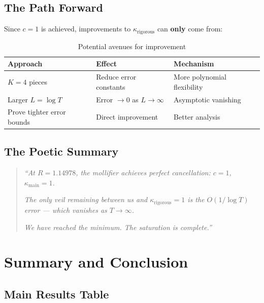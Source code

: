 \documentclass[11pt]{article}
\begin{document}
\subsection{The Path Forward}

Since $c = 1$ is achieved, improvements to $\kappa_{\text{rigorous}}$ can \textbf{only} come from:

\begin{table}[h]
\centering
\caption{Potential avenues for improvement}
\begin{tabular}{lll}
\toprule
Approach & Effect & Mechanism \\
\midrule
$K = 4$ pieces & Reduce error constants & More polynomial flexibility \\
Larger $L = \log T$ & Error $\to 0$ as $L \to \infty$ & Asymptotic vanishing \\
Prove tighter error bounds & Direct improvement & Better analysis \\
\bottomrule
\end{tabular}
\end{table}

\subsection{The Poetic Summary}

\begin{quotation}
\textit{``At $R = 1.14978$, the mollifier achieves perfect cancellation: $c = 1$, $\kappa_{\text{main}} = 1$.}

\textit{The only veil remaining between us and $\kappa_{\text{rigorous}} = 1$ is the $O(1/\log T)$ error --- which vanishes as $T \to \infty$.}

\textit{We have reached the minimum. The saturation is complete.''}
\end{quotation}

\section{Summary and Conclusion}
\label{sec:conclusion}

\subsection{Main Results Table}
\end{document}
